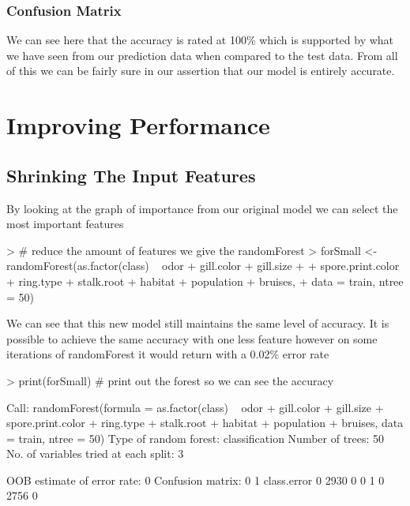 \documentclass[10pt]{article}         %
\begin{document}
\pagebreak\subsubsection{Confusion Matrix}
\begin{Schunk}
\end{Schunk}
We can see here that the accuracy is rated at 100\% which is supported by what we have seen from our prediction data when compared to the test data. From all of this we can be fairly sure in our assertion that our model is entirely accurate.

\pagebreak\section{Improving Performance}
\subsection{Shrinking The Input Features}
By looking at the graph of importance from our original model we can select the most important features
\begin{Schunk}
\begin{Sinput}
> # reduce the amount of features we give the randomForest
> forSmall <- randomForest(as.factor(class) ~ odor + gill.color + gill.size +
+ 		spore.print.color + ring.type + stalk.root + habitat + population + bruises,
+ 	data = train, ntree = 50)
\end{Sinput}
\end{Schunk}

We can see that this new model still maintains the same level of accuracy. It is possible to achieve the same accuracy with one less feature however on some iterations of randomForest it would return with a 0.02\% error rate
\begin{Schunk}
\begin{Sinput}
> print(forSmall) # print out the forest so we can see the accuracy
\end{Sinput}
\begin{Soutput}
Call:
 randomForest(formula = as.factor(class) ~ odor + gill.color +      gill.size + spore.print.color + ring.type + stalk.root +      habitat + population + bruises, data = train, ntree = 50) 
               Type of random forest: classification
                     Number of trees: 50
No. of variables tried at each split: 3

        OOB estimate of  error rate: 0%
Confusion matrix:
     0    1 class.error
0 2930    0           0
1    0 2756           0
\end{Soutput}
\end{Schunk}
\end{document}
